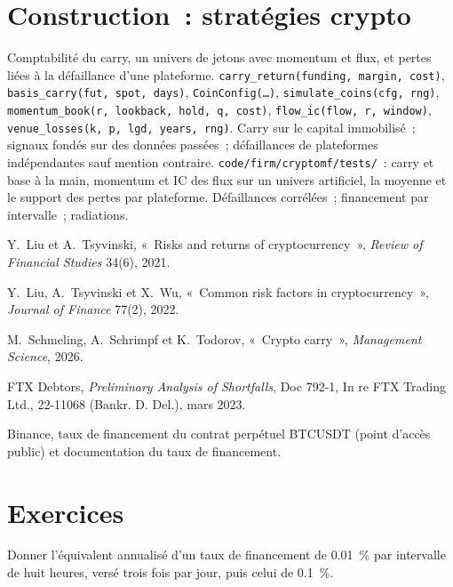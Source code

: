 \section{Construction~: stratégies crypto}\label{bld:s1:crypto-medium-frequency-strategies:cryptomf}

\begin{build}
 Comptabilité du carry, un univers de jetons avec momentum et flux, et pertes liées à la défaillance d'une plateforme.
 \texttt{carry\_return(funding, margin, cost)}, \texttt{basis\_carry(fut, spot, days)}, \texttt{CoinConfig(\dots)},
\texttt{simulate\_coins(cfg, rng)}, \texttt{momentum\_book(r, lookback, hold, q, cost)}, \texttt{flow\_ic(flow, r, window)},
\texttt{venue\_losses(k, p, lgd, years, rng)}.
 Carry sur le capital immobilisé~; signaux fondés sur des données passées~; défaillances de plateformes indépendantes sauf mention contraire.
 \texttt{code/firm/cryptomf/tests/}~: carry et base à la main, momentum et IC des flux sur un univers artificiel, la moyenne et le support
des pertes par plateforme.
 Défaillances corrélées~; financement par intervalle~; radiations.
\end{build}

\begin{omsources}
\item Y.~Liu et A.~Tsyvinski, «~Risks and returns of cryptocurrency~», \emph{Review of Financial Studies} 34(6), 2021.
\item Y.~Liu, A.~Tsyvinski et X.~Wu, «~Common risk factors in cryptocurrency~», \emph{Journal of Finance} 77(2), 2022.
\item M.~Schmeling, A.~Schrimpf et K.~Todorov, «~Crypto carry~», \emph{Management Science}, 2026.
\item FTX Debtors, \emph{Preliminary Analysis of Shortfalls}, Doc 792-1, In re FTX Trading Ltd., 22-11068 (Bankr. D. Del.), mars 2023.
\item Binance, taux de financement du contrat perpétuel BTCUSDT (point d'accès public) et documentation du taux de financement.
\end{omsources}

\section{Exercices}

\begin{exercise}[$\star$]\label{exo:s1:crypto-medium-frequency-strategies:1}
Donner l'équivalent annualisé d'un taux de financement de 0.01~\% par intervalle de huit heures, versé trois fois par jour, puis celui de 0.1~\%.
\end{exercise}

